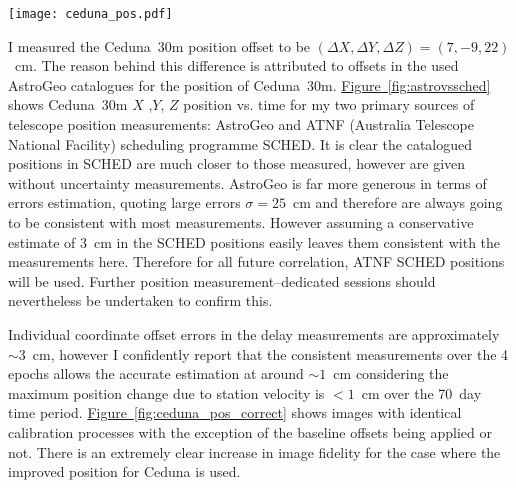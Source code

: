 					\begin{SCfigure}[][h]
						\centering
						\texttt{[image: ceduna\_pos.pdf]}
						\caption[AstroGeo vs. SCHED Ceduna Position]{Ceduna X (red), Y (blue) and Z (green) position vs. time for SCHED (solid) and AstroGeo (dotted) catalogued positions as compared to the mean position determined at all MV02* epchs (black + error bars).} \label{fig:astrovssched}
					\end{SCfigure}
					
					I measured the Ceduna~30m position offset to be $(\Delta X, \Delta Y, \Delta Z)=(7,-9,22)$~cm. The reason behind this difference is attributed to offsets in the used AstroGeo catalogues for the position of Ceduna~30m. \hyperref[fig:astrovssched]{Figure~\ref*{fig:astrovssched}} shows Ceduna~30m $X$ ,$Y$, $Z$ position vs. time for my two primary sources of telescope position measurements: AstroGeo and ATNF (Australia Telescope National Facility) scheduling programme SCHED. It is clear the catalogued positions in SCHED are much closer to those measured, however are given without uncertainty measurements. AstroGeo is far more generous in terms of errors estimation, quoting large errors $\sigma = 25$~cm and therefore are always going to be consistent with most measurements. However assuming a conservative estimate of $3$~cm in the SCHED positions easily leaves them consistent with the measurements here. Therefore for all future \spirals\space correlation, ATNF SCHED positions will be used. Further position measurement--dedicated sessions should nevertheless be undertaken to confirm this.
					
					Individual coordinate offset errors in the delay measurements are approximately $\sim3$~cm, however I confidently report that the consistent measurements over the 4 epochs allows the accurate estimation at around $\sim1$~cm considering the maximum position change due to station velocity is $<1$~cm over the 70~day time period. \hyperref[fig:ceduna_pos_correct]{Figure~\ref*{fig:ceduna_pos_correct}} shows images with identical calibration processes with the exception of the baseline offsets being applied or not. There is an extremely clear increase in image fidelity for the case where the improved position for Ceduna is used.
					
